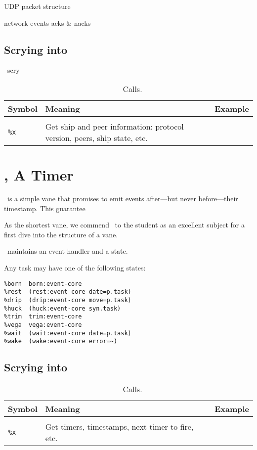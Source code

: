 UDP packet structure

network events
acks \& nacks

\subsection{Scrying into \ames}

\ames~scry

\begin{table}[h!]
  \begin{center}
    \caption{\ames~\dotket~Calls.}
    \label{ha:ames}
    \begin{tabular}{lll}
      Symbol & Meaning & Example \\
      \hline \\
      \texttt{\%x} & Get ship and peer information:  protocol version, peers, ship state, etc. & \\
    \end{tabular}
  \end{center}
\end{table}


\section[\behn]{\behn, A Timer}

\behn~is a simple vane that promises to emit events after—but never before—their timestamp.  This guarantee

As the shortest vane, we commend \behn~to the student as an excellent subject for a first dive into the structure of a vane.

\behn~maintains an event handler and a state.

Any task may have one of the following states:

\begin{lstlisting}
%born  born:event-core
%rest  (rest:event-core date=p.task)
%drip  (drip:event-core move=p.task)
%huck  (huck:event-core syn.task)
%trim  trim:event-core
%vega  vega:event-core
%wait  (wait:event-core date=p.task)
%wake  (wake:event-core error=~)
\end{lstlisting}

\subsection{Scrying into \behn}

\begin{table}[h!]
  \begin{center}
    \caption{\behn~\dotket~Calls.}
    \label{ha:behn}
    \begin{tabular}{lll}
      Symbol & Meaning & Example \\
      \hline \\
      \texttt{\%x} & Get timers, timestamps, next timer to fire, etc. & \\
    \end{tabular}
  \end{center}
\end{table}

